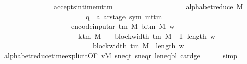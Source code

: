 \begin{isabellebody}
\ \ \ \ \ \ \ \ \ \ \ \ \ \ {\isasymlongrightarrow}\ accepts{\isacharunderscore}{\kern0pt}in{\isacharunderscore}{\kern0pt}time{\isacharunderscore}{\kern0pt}mttm\isanewline
\ \ \ \ \ \ \ \ \ \ \ \ \ \ \ \ \ \ \ \ {\isacharparenleft}{\kern0pt}alphabet{\isacharunderscore}{\kern0pt}reduce\ M\isanewline
\ \ \ \ \ \ \ \ \ \ \ \ \ \ \ \ \ \ \ \ \ \ \ {\isacharcolon}{\kern0pt}{\isacharcolon}{\kern0pt}\ {\isacharparenleft}{\kern0pt}{\isacharprime}{\kern0pt}q\ {\isasymtimes}\ {\isacharprime}{\kern0pt}a\ ar{\isacharunderscore}{\kern0pt}stage{\isacharcomma}{\kern0pt}\ sym{}{\isacharparenright}{\kern0pt}\ mttm{\isacharparenright}{\kern0pt}\isanewline
\ \ \ \ \ \ \ \ \ \ \ \ \ \ \ \ \ \ \ \ {\isacharparenleft}{\kern0pt}encode{\isacharunderscore}{\kern0pt}input{\isacharunderscore}{\kern0pt}ar\ {\isacharparenleft}{\kern0pt}{\isasymGamma}{\isacharunderscore}{\kern0pt}tm\ M{\isacharparenright}{\kern0pt}\ {\isacharparenleft}{\kern0pt}bl{\isacharunderscore}{\kern0pt}tm\ M{\isacharparenright}{\kern0pt}\ w{\isacharparenright}{\kern0pt}\isanewline
\ \ \ \ \ \ \ \ \ \ \ \ \ \ \ \ \ \ \ \ {\isacharparenleft}{\kern0pt}{\isacharparenleft}{\kern0pt}{}\ {\isacharasterisk}{\kern0pt}\ k{\isacharunderscore}{\kern0pt}tm\ M\ {\isacharplus}{\kern0pt}\ {}{\isacharparenright}{\kern0pt}\ {\isacharasterisk}{\kern0pt}\ block{\isacharunderscore}{\kern0pt}width\ {\isacharparenleft}{\kern0pt}{\isasymGamma}{\isacharunderscore}{\kern0pt}tm\ M{\isacharparenright}{\kern0pt}\ {\isacharasterisk}{\kern0pt}\ T\ {\isacharparenleft}{\kern0pt}length\ w{\isacharparenright}{\kern0pt}\isanewline
\ \ \ \ \ \ \ \ \ \ \ \ \ \ \ \ \ \ \ \ \ \ \ {\isacharplus}{\kern0pt}\ {}\ {\isacharasterisk}{\kern0pt}\ block{\isacharunderscore}{\kern0pt}width\ {\isacharparenleft}{\kern0pt}{\isasymGamma}{\isacharunderscore}{\kern0pt}tm\ M{\isacharparenright}{\kern0pt}\ {\isacharasterisk}{\kern0pt}\ length\ w\ {\isacharplus}{\kern0pt}\ {}{\isacharparenright}{\kern0pt}{\isachardoublequoteclose}\isanewline
\ \ \ \ \isamarkupfalse%
\ alphabet{\isacharunderscore}{\kern0pt}reduce{\isacharunderscore}{\kern0pt}time{\isacharunderscore}{\kern0pt}explicit{\isacharbrackleft}{\kern0pt}OF\ vM\ s{\isacharunderscore}{\kern0pt}neq{\isacharunderscore}{\kern0pt}t\ s{\isacharunderscore}{\kern0pt}neq{\isacharunderscore}{\kern0pt}r\ le{\isacharunderscore}{\kern0pt}neq{\isacharunderscore}{\kern0pt}bl\ card{\isacharunderscore}{\kern0pt}ge{\isacharbrackright}{\kern0pt}\isanewline
\ \ \ \ \isamarkupfalse%
\ simp\isanewline
\ \ \isamarkupfalse%

\end{isabellebody}
